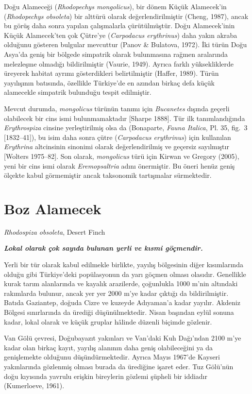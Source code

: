 \documentclass[
  10.5pt,
  a4paper,
  DIV=11,
  numbers=noendperiod,
  twocolumn]{scrreprt}
\begin{document}
Doğu Alameceği (\emph{Rhodopechys mongolicus}), bir dönem Küçük
Alamecek'in (\emph{Rhodopechys obsoleta}) bir alttürü olarak
değerlendirilmiştir (Cheng, 1987), ancak bu görüş daha sonra yapılan
çalışmalarla çürütülmüştür. Doğu Alamecek'inin Küçük Alamecek'ten çok
Çütre'ye (\emph{Carpodacus erythrinus}) daha yakın akraba olduğunu
gösteren bulgular mevcuttur (Panov \& Bulatova, 1972). İki türün Doğu
Asya'da geniş bir bölgede simpatrik olarak bulunmasına rağmen aralarında
melezleşme olmadığı bildirilmiştir (Vaurie, 1949). Ayrıca farklı
yüksekliklerde üreyerek habitat ayrımı gösterdikleri belirtilmiştir
(Haffer, 1989). Türün yayılışının batısında, özellikle Türkiye'de en
azından birkaç defa küçük alamecekle simpatrik bulunduğu tespit
edilmiştir.

Mevcut durumda, \emph{mongolicus} türünün tanımı için \emph{Bucanetes}
dışında geçerli olabilecek bir cins ismi bulunmamaktadır {[}Sharpe
1888{]}. Tür ilk tanımlandığında \emph{Erythrospiza} cinsine
yerleştirilmiş olsa da (Bonaparte, \emph{Fauna Italica}, Pl. 35, fig.~3
{[}1832--41{]}), bu isim daha sonra çütre (\emph{Carpodacus erythrinus})
için kullanılan \emph{Erythrina} altcinsinin sinonimi olarak
değerlendirilmiş ve geçersiz sayılmıştır {[}Wolters 1975--82{]}. Son
olarak, \emph{mongolicus} türü için Kirwan ve Gregory (2005), yeni bir
cins ismi olarak \emph{Eremopsaltria} adını önermiştir. Bu öneri henüz
geniş ölçekte kabul görmemiştir ancak taksonomik tartışmalar
sürmektedir.

\section{Boz Alamecek}\label{boz-alamecek}

\emph{Rhodospiza obsoleta}, Desert Finch

\textbf{\emph{Lokal olarak çok sayıda bulunan yerli ve kısmi
göçmendir.}}

Yerli bir tür olarak kabul edilmekle birlikte, yayılış bölgesinin diğer
kısımlarında olduğu gibi Türkiye'deki popülasyonun da yarı göçmen olması
olasıdır. Genellikle kurak tarım alanlarında ve kayalık arazilerde,
çoğunlukla 1000 m'nin altındaki rakımlarda bulunur, ancak yer yer 2000
m'ye kadar çıktığı da bildirilmiştir. Batıda Gaziantep, doğuda Cizre ve
kuzeyde Adıyaman'a kadar yayılır. Akdeniz Bölgesi sınırlarında da
ürediği düşünülmektedir. Nisan başından eylül sonuna kadar, lokal olarak
ve küçük gruplar hâlinde düzenli biçimde gözlenir.

Van Gölü çevresi, Doğubayazıt yakınları ve Van'daki Kuh Dağı'ndan 2100
m'ye kadar olan birkaç kayıt, yayılış alanının daha geniş olabileceğini
ya da genişlemekte olduğunu düşündürmektedir. Ayrıca Mayıs 1967'de
Kayseri yakınlarında gözlenmiş olması burada da ürediğine işaret eder.
Tuz Gölü'nün doğu kıyısında yavrulu erişkin bireylerin gözlemi şüpheli
bir iddiadır (Kumerloeve, 1961).
\end{document}
